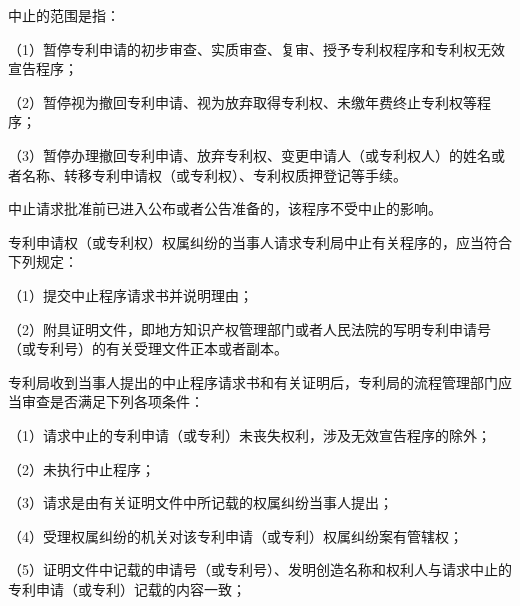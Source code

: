 中止的范围是指：

{\setlength{\parindent}{17.1bp}（1）暂停专利申请的初步审查、实质审查、复审、授予专利权程序和专利权无效宣告程序；\par}

{\setlength{\parindent}{17.1bp}（2）暂停视为撤回专利申请、视为放弃取得专利权、未缴年费终止专利权等程序；\par}

{\setlength{\parindent}{17.1bp}（3）暂停办理撤回专利申请、放弃专利权、变更申请人（或专利权人）的姓名或者名称、转移专利申请权（或专利权）、专利权质押登记等手续。\par}

中止请求批准前已进入公布或者公告准备的，该程序不受中止的影响。

专利申请权（或专利权）权属纠纷的当事人请求专利局中止有关程序的，应当符合下列规定：

{\setlength{\parindent}{17.1bp}（1）提交中止程序请求书并说明理由；\par}

{\setlength{\parindent}{17.1bp}（2）附具证明文件，即地方知识产权管理部门或者人民法院的写明专利申请号（或专利号）的有关受理文件正本或者副本。\par}

专利局收到当事人提出的中止程序请求书和有关证明后，专利局的流程管理部门应当审查是否满足下列各项条件：

{\setlength{\parindent}{17.1bp}（1）请求中止的专利申请（或专利）未丧失权利，涉及无效宣告程序的除外；\par}

{\setlength{\parindent}{17.1bp}（2）未执行中止程序；\par}

{\setlength{\parindent}{17.1bp}（3）请求是由有关证明文件中所记载的权属纠纷当事人提出；\par}

{\setlength{\parindent}{17.1bp}（4）受理权属纠纷的机关对该专利申请（或专利）权属纠纷案有管辖权；\par}

{\setlength{\parindent}{17.1bp}（5）证明文件中记载的申请号（或专利号）、发明创造名称和权利人与请求中止的专利申请（或专利）记载的内容一致；\par}

